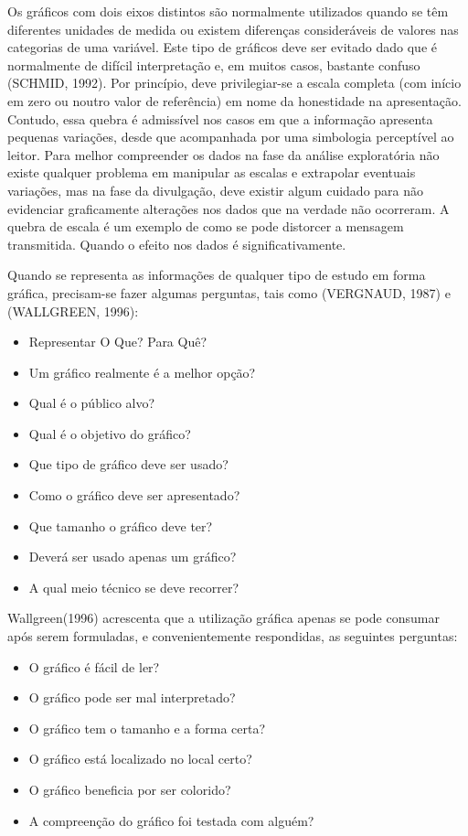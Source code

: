 \begin{itemize}

\inic Os gráficos com dois eixos distintos são normalmente utilizados quando se têm diferentes unidades de medida ou existem diferenças consideráveis de valores nas categorias de uma variável. Este tipo de gráficos deve ser evitado dado que é normalmente de difícil interpretação e, em muitos casos, bastante confuso (SCHMID, 1992). Por princípio, deve privilegiar-se a escala completa (com início em zero ou noutro valor de referência) em nome da honestidade na apresentação. Contudo, essa quebra é admissível nos casos em que a informação apresenta pequenas variações, desde que acompanhada por uma simbologia perceptível ao leitor. Para melhor compreender os dados na fase da análise exploratória não existe qualquer problema em manipular as escalas e extrapolar eventuais variações, mas na fase da divulgação, deve existir algum cuidado para não evidenciar graficamente alterações nos dados que na verdade não ocorreram. A quebra de escala é um exemplo de como se pode distorcer a mensagem transmitida. Quando o efeito nos dados é significativamente. 
\end{itemize}


Quando se representa as informações de qualquer tipo de estudo em forma gráfica, precisam-se fazer algumas perguntas, tais como (VERGNAUD, 1987) e (WALLGREEN, 1996):

\begin{itemize}
\item Representar O Que? Para Quê?
\item Um gráfico realmente é a melhor opção?
\item Qual é o público alvo?
\item Qual é o objetivo do gráfico?
\item Que tipo de gráfico deve ser usado?
\item Como o gráfico deve ser apresentado?
\item Que tamanho o gráfico deve ter?
\item Deverá ser usado apenas um gráfico?
\item A qual meio técnico se deve recorrer?
\end{itemize}

Wallgreen(1996) acrescenta que a utilização gráfica apenas se pode
consumar após serem formuladas, e convenientemente respondidas, as
seguintes perguntas:

\begin{itemize}
\item O gráfico é fácil de ler? \item O gráfico pode ser mal
interpretado? \item O gráfico tem o tamanho e a forma certa? \item
O gráfico está localizado no local certo? \item O gráfico
beneficia por ser colorido? \item A compreenção do gráfico foi
testada com alguém?
\end{itemize}



